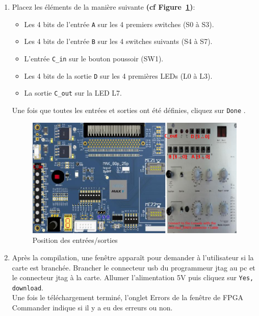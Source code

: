 \documentclass[nosolution]{exercice}
\begin{document}
\begin{enumerate}
\item Placez les éléments de la manière suivante \textbf{(cf Figure~\ref{fig_mapped})}:
\begin{itemize}
\item Les 4 bits de l'entrée \texttt{A} sur les 4 premiers switches (S0 à S3).
\item Les 4 bits de l'entrée \texttt{B} sur les 4 switches suivants (S4 à S7).
\item L'entrée \texttt{C\_in} sur le bouton poussoir (SW1).
\item Les 4 bits de la sortie \texttt{D} sur les 4 premières LEDs (L0 à L3).
\item La sortie \texttt{C\_out} sur la LED L7.\\
\end{itemize}
Une fois que toutes les entrées et sorties ont été définies, cliquez sur \texttt{Done} .

\begin{figure}[H]
\begin{center}
\includegraphics[width=350pt]{images/logisim_mapped.png}
\caption{\label{fig_mapped}Position des entrées/sorties}
\end{center}
\end{figure}

\item 
Après la compilation, une fenêtre apparaît pour demander à l'utilisateur si la carte est branchée. Brancher le connecteur usb du programmeur jtag au pc et le connecteur jtag à la carte. Allumer l'alimentation 5V puis cliquez sur \texttt{Yes, download}.\\
Une fois le téléchargement terminé, l'onglet Errors de la fenêtre de FPGA Commander indique si il y a eu des erreurs ou non.


\end{enumerate}


\end{document}
